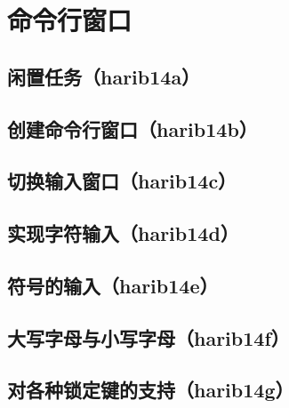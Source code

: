 ﻿\chapter{	命令行窗口	}
\section{	闲置任务（harib14a）	}
\section{	创建命令行窗口（harib14b）	}
\section{	切换输入窗口（harib14c）	}
\section{	实现字符输入（harib14d）	}
\section{	符号的输入（harib14e）	}
\section{	大写字母与小写字母（harib14f）	}
\section{	对各种锁定键的支持（harib14g）	}

